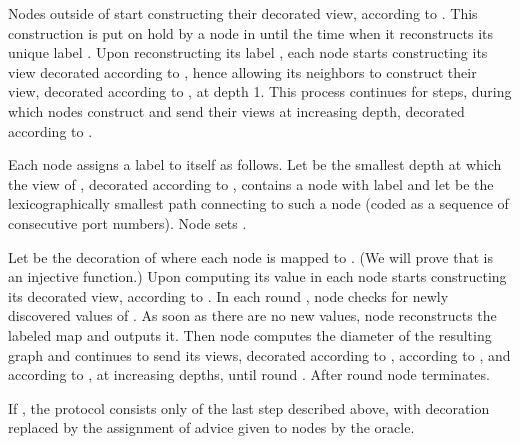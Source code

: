 \documentclass{article}
\newcommand{\procend}{\hfill \medskip}
\begin{document}
Nodes outside of   start constructing their decorated view, according to . This construction is put on hold by a node  in  until the time when it reconstructs its unique label .
Upon reconstructing its label , each node  starts constructing its view decorated according to , hence allowing its neighbors to construct their view, decorated according to , at depth 1.
This process continues for  steps, during which nodes construct and send their views at increasing depth, decorated according to .

Each node  assigns a label  to itself as follows.
Let  be the smallest depth at which the view of , decorated according to , contains a node  with label  and let  be the lexicographically smallest path connecting  to such a node  (coded as a sequence of consecutive port numbers). Node  sets .



Let  be the decoration of  where each node  is mapped to .
(We will prove that  is an injective function.)
Upon computing its value in  each node starts constructing its decorated view, according to .
In each round , node  checks for newly discovered values of .
As soon as there are no new values, node  reconstructs the labeled map and outputs it.
Then node  computes the diameter  of the resulting graph and continues to send its views, decorated according to , according to  , and according to , at increasing depths, until round .  After round  node  terminates.

If , the protocol consists only of the last step described above, with decoration  replaced by the assignment of advice given to nodes by the oracle.
\procend
\end{document}
